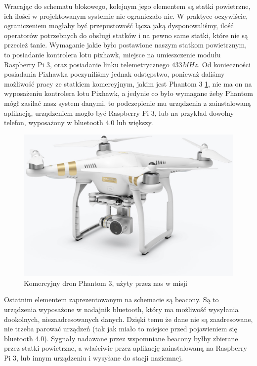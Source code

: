 Wracając do schematu blokowego, kolejnym jego elementem są statki powietrzne, ich ilości w projektowanym systemie nie ograniczało nic. W praktyce oczywiście, ograniczeniem mogłaby być przepustowość łącza jaką dysponowaliśmy, ilość operatorów potrzebnych do obsługi statków i na pewno same statki, które nie są przecież tanie. Wymaganie jakie było postawione naszym statkom powietrznym, to posiadanie kontrolera lotu pixhawk, miejsce na umieszczenie modułu Raspberry Pi 3, oraz posiadanie linku telemetrycznego $433 MHz$. Od konieczności posiadania Pixhawka poczyniliśmy jednak odstępstwo, ponieważ daliśmy możliwość pracy ze statkiem komercyjnym, jakim jest Phantom 3 \ref{fig:phantom}, nie ma on na wyposażeniu kontrolera lotu Pixhawk, a jedynie co było wymagane żeby Phantom mógł zasilać nasz system danymi, to podczepienie mu urządzenia z zainstalowaną aplikacją, urządzeniem mogło być Raspberry Pi 3, lub na przykład dowolny telefon, wyposażony w bluetooth 4.0 lub większy.

\begin{figure}[!th]
    \centering
    \includegraphics[width=15cm]{zalaczniki/obrazy/phantom3.jpg}
	\caption{Komercyjny dron Phantom 3, użyty przez nas w misji}
    \label{fig:phantom}
\end{figure}

Ostatnim elementem zaprezentowanym na schemacie są beacony. Są to urządzenia wyposażone w nadajnik bluetooth, który ma możliwość wysyłania dookolnych, niezaadresowanych danych. Dzięki temu że dane nie są zaadresowane, nie trzeba parować urządzeń (tak jak miało to miejsce przed pojawieniem się bluetooth 4.0). Sygnały nadawane przez wspomniane beacony byłby zbierane przez statki powietrzne, a właściwie przez aplikację zainstalowaną na Raspberry Pi 3, lub innym urządzeniu i wysyłane do stacji naziemnej.

